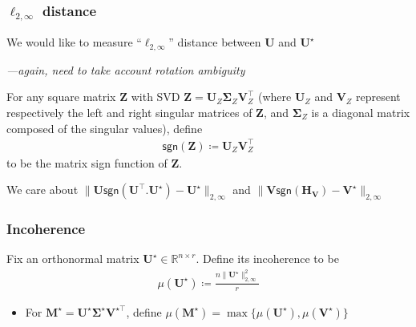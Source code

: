 \documentclass[compress,
mathserif,wide,%
]{beamer}
\begin{document}
\begin{frame}
	\frametitle{$\ell_{2,\infty}$ distance}
	We would like to measure ``$\ell_{2,\infty}$'' distance between $\bm{U}$ and $\bm{U}^\star$
	
	{\hfill \em ---again, need to take account rotation ambiguity}
	
	\begin{definition} For any square matrix $\bm{Z}$ with SVD $\bm{Z}=\bm{U}_{Z}\bm{\Sigma}_Z\bm{V}_{Z}^{\top}$ (where $\bm{U}_Z$ and $\bm{V}_Z$ represent respectively the left and right singular matrices of $\bm{Z}$, and $\bm{\Sigma}_Z$ is a diagonal matrix composed of the singular values), define
%
\begin{align}
	\mathsf{sgn}(\bm{Z}) \coloneqq \bm{U}_{Z}  \bm{V}_{Z}^{\top}
	\label{eq:defn-sgn-Z}
\end{align}
%
to be the matrix sign function of $\bm{Z}$.
\end{definition}

We care about $\|\bm{U}\mathsf{sgn}(\bm{U}^\top. \bm{U}^\star)-\bm{U}^{\star}\|_{2,\infty}$ and $\|\bm{V}\mathsf{sgn}(\bm{H}_{\bm{V}})-\bm{V}^{\star}\|_{2,\infty}$
\end{frame}

\begin{frame}
	\frametitle{Incoherence}
	\begin{definition}
	Fix an orthonormal matrix $\bm{U}^\star \in \mathbb{R}^{n \times r}$. Define its incoherence to be
	\begin{align*}
	\mu(\bm{U}^\star) \coloneqq \frac{n\|\bm{U}^{\star}\|_{2,\infty}^{2}}{r} 
\end{align*}
\end{definition}

\vfill 
\begin{itemize}
	\item For $\bm{M}^{\star} = \bm{U}^{\star}\bm{\Sigma}^{\star}\bm{V}^{\star\top}$, define $\mu(\bm{M}^\star) = \max\{\mu(\bm{U}^\star), \mu(\bm{V}^\star)\}$
\end{itemize}
\end{frame}
\end{document}
